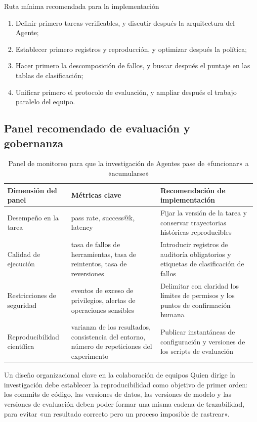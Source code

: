 \documentclass[a4paper]{article}
\begin{document}
\begin{importantbox}{Ruta mínima recomendada para la implementación}
\begin{enumerate}
    \item Definir primero tareas verificables, y discutir después la arquitectura del Agente;
    \item Establecer primero registros y reproducción, y optimizar después la política;
    \item Hacer primero la descomposición de fallos, y buscar después el puntaje en las tablas de clasificación;
    \item Unificar primero el protocolo de evaluación, y ampliar después el trabajo paralelo del equipo.
\end{enumerate}
\end{importantbox}

\subsection{Panel recomendado de evaluación y gobernanza}
\begin{table}[H]
\centering
\begin{tabular}{p{2.8cm}p{4.1cm}p{4.6cm}}
\toprule
\textbf{Dimensión del panel} & \textbf{Métricas clave} & \textbf{Recomendación de implementación} \\
\midrule
Desempeño en la tarea & pass rate, success@k, latency & Fijar la versión de la tarea y conservar trayectorias históricas reproducibles \\
Calidad de ejecución & tasa de fallos de herramientas, tasa de reintentos, tasa de reversiones & Introducir registros de auditoría obligatorios y etiquetas de clasificación de fallos \\
Restricciones de seguridad & eventos de exceso de privilegios, alertas de operaciones sensibles & Delimitar con claridad los límites de permisos y los puntos de confirmación humana \\
Reproducibilidad científica & varianza de los resultados, consistencia del entorno, número de repeticiones del experimento & Publicar instantáneas de configuración y versiones de los scripts de evaluación \\
\bottomrule
\end{tabular}
\caption{Panel de monitoreo para que la investigación de Agentes pase de «funcionar» a «acumularse»}
\end{table}

\begin{knowledgebox}{Un diseño organizacional clave en la colaboración de equipos}
Quien dirige la investigación debe establecer la reproducibilidad como objetivo de primer orden:
los commits de código, las versiones de datos, las versiones de modelo y las versiones de evaluación deben poder formar una misma cadena de trazabilidad, para evitar «un resultado correcto pero un proceso imposible de rastrear».
\end{knowledgebox}
\end{document}
